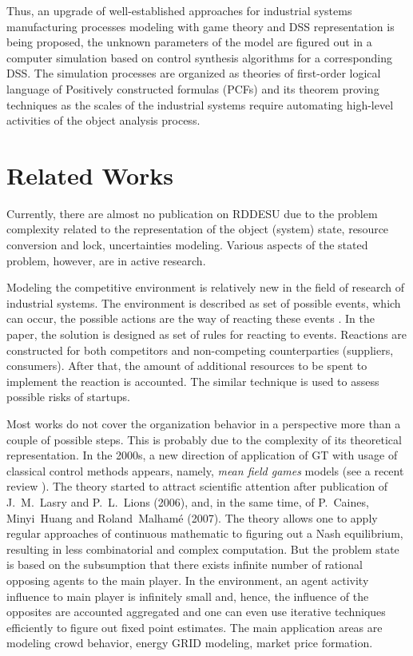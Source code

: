 \documentclass[conference,a4paper]{IEEEtran}
\begin{document}
Thus, an upgrade of well-established approaches for industrial systems manufacturing processes modeling with game theory and DSS representation is being proposed, the unknown parameters of the model are figured out in a computer simulation based on control synthesis algorithms for a corresponding DSS.  The simulation processes are organized as theories of first-order logical language of Positively constructed formulas (PCFs) and its theorem proving techniques as the scales of the industrial systems require automating high-level activities of the object analysis process.

\section{Related Works}
\label{sec:rel-works}

Currently, there are almost no publication on RDDESU due to the problem complexity related to the representation of the object (system) state, resource conversion and lock, uncertainties modeling.  Various aspects of the stated problem, however, are in active research.

Modeling the competitive environment is relatively new in the field of research of industrial systems. The environment is described as set of possible events, which can occur, the possible actions are the way of reacting these events \cite{andres,ahmed}. In the paper, the solution is designed as set of rules for reacting to events. Reactions are constructed for both competitors and non-competing counterparties (suppliers, consumers).  After that, the amount of additional resources to be spent to implement the reaction is accounted.  The similar technique is used to assess possible risks of startups.

Most works do not cover the organization behavior in a perspective more than a couple of possible steps. This is probably due to the complexity of its theoretical representation. In the 2000s, a new direction of application of GT with usage of classical control methods appears, namely, \emph{mean field games} models (see a recent review \cite{gomes}). The theory started to attract scientific attention after publication of J.~M.~Lasry and P.~L.~Lions (2006), and, in the same time, of P.~Caines, Minyi~Huang and Roland~Malhamé (2007). The theory allows one to apply regular approaches of continuous mathematic to figuring out a Nash equilibrium, resulting in less combinatorial and complex computation. But the problem state is based on the subsumption that there exists infinite number of rational opposing agents to the main player. In the environment, an agent activity influence to main player is infinitely small and, hence, the influence of the opposites are accounted aggregated and one can even use iterative techniques efficiently to figure out fixed point estimates. The main application areas are modeling crowd behavior, energy GRID modeling, market price formation.
\end{document}

